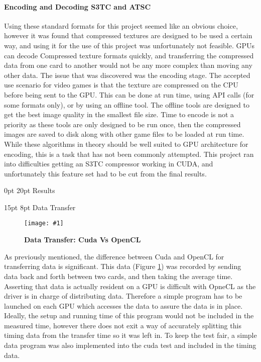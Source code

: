 \documentclass[12pt,a4paper]{article}
\makeatletter
\newcommand{\figuremacroWHN}[3]{
	\begin{figure}[h!] %
		\centering
		\texttt{[image: \#1]}
		\caption[#2]{\textbf{#2}}
		\label{fig:#1}
	\end{figure}
}
\renewcommand\subsection{\@startsection {subsection}{1}{2mm} %
                               {15pt} %
                               {8pt} %
                               {\fontsize{13pt}{1em}\bfseries}}
\renewcommand\section{\@startsection {section}{1}{0mm} %
                               {0pt} %
                               {20pt} %
                               {\fontsize{14pt}{1em}\bfseries\newpage}}
\makeatother
\begin{document}
\paragraph{Encoding and Decoding S3TC and ATSC}
Using these standard formats for this project seemed like an obvious choice, however it was found that compressed textures are designed to be used a certain way, and using it for the use of this project was unfortunately not feasible.
GPUs can decode Compressed texture formats quickly, and transferring the compressed data from one card to another would not be any more complex than moving any other data. The issue that was discovered was the encoding stage. The accepted use scenario for video games is that the texture are compressed on the CPU before being sent to the GPU. This can be done at run time, using API calls (for some formats only), or by using an offline tool. The offline tools are designed to get the best image quality in the smallest file size. Time to encode is not a priority as these tools are only designed to be run once, then the compressed images are saved to disk along with other game files to be loaded at run time.
While these algorithms in theory should be well suited to GPU architecture for encoding, this is a task that has not been commonly attempted. This project ran into difficulties getting an S3TC compressor working in CUDA, and  unfortunately this feature set had to be cut from the final results. 

\section{Results}

\subsection{Data Transfer}

\figuremacroWHN
{DataTransferCudaUVAVSOpenCL}
{Data Transfer: Cuda Vs OpenCL}
{1.0}

As previously mentioned, the difference between Cuda and OpenCL for transferring data is significant. This data (Figure \ref{fig:DataTransferCudaUVAVSOpenCL}) was recorded by sending data back and forth between two cards, and then taking the average time. 
Asserting that data is actually resident on a GPU is difficult with OpneCL as the driver is in charge of distributing data. 
Therefore a simple program has to be launched on each GPU which accesses the data to assure the data is in place.
Ideally, the setup and running time of this program would not be included in the measured time, however there does not exit a way of accurately splitting this timing data from the transfer time so it was left in. 
To keep the test fair, a simple data program was also implemented into the cuda test and included in the timing data.
\end{document}
